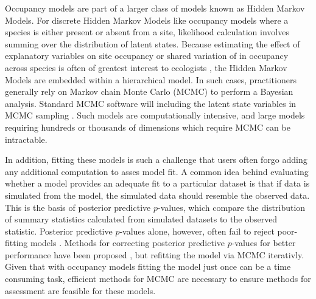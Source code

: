 \documentclass[12pt]{article}
\begin{document}
Occupancy models are part of a larger class of models known as Hidden
Markov Models. For discrete Hidden Markov Models like occupancy models
where a species is either present or absent from a site, likelihood
calculation involves summing over the distribution of latent
states. Because estimating the effect of explanatory variables on site
occupancy or shared variation of in occupancy across species is often
of greatest interest to ecologists
\citep[e.g.,][]{iknayan2014detecting}, the Hidden Markov Models are
embedded within a hierarchical model. In such cases, practitioners
generally rely on Markov chain Monte Carlo (MCMC) to perform a
Bayesian analysis. Standard MCMC software will including the latent
state variables in MCMC sampling \citep[e.g.,][]{plummer-2003-jags,
  winbugs, openbugs}. Such models are computationally intensive, and
large models requiring hundreds or thousands of dimensions which
require MCMC can be intractable.

In addition, fitting these models is such a challenge that users often
forgo adding any additional computation to asses model fit. A common
idea behind evaluating whether a model provides an adequate fit to a
particular dataset is that if data is simulated from the model, the
simulated data should resemble the observed data. This is the basis of
posterior predictive $p$-values, which compare the distribution of
summary statistics calculated from simulated datasets to the observed
statistic. Posterior predictive $p$-values alone, however, often fail
to reject poor-fitting models \citep{bayarri-berger-00,
  robins-etal-00, hjort-etal-06}. Methods for correcting posterior
predictive $p$-values for better performance have been proposed
\citep[e.g., calibrated posterior predictive $p$-values,
][]{hjort-etal-06}, but refitting the model via MCMC iterativly. Given
that with occupancy models fitting the model just once can be a time
consuming task, efficient methods for MCMC are necessary to ensure
methods for assessment are feasible for these models.
\end{document}
